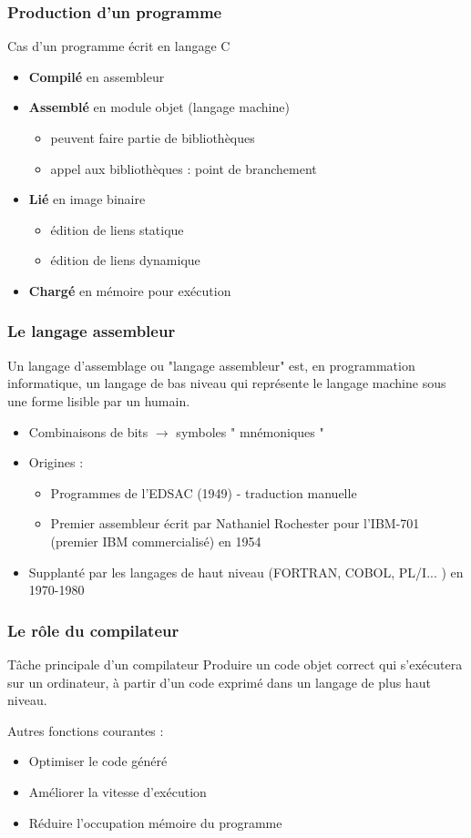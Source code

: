 \begin{frame}
\frametitle{Production d'un programme}
Cas d'un programme écrit en langage C
\begin{itemize}
\item \textbf{Compilé} en assembleur
\item \textbf{Assemblé} en module objet (langage machine)
\begin{itemize}
\item peuvent faire partie de bibliothèques
\item appel aux bibliothèques : point de branchement
\end{itemize}
\item \textbf{Lié} en image binaire
\begin{itemize}
\item édition de liens statique
\item édition de liens dynamique
\end{itemize}
\item \textbf{Chargé} en mémoire pour exécution
\end{itemize}
\end{frame}

\begin{frame}
\frametitle{Le langage assembleur \cite{wp-assembleur}}
\begin{definition}
Un langage d'assemblage ou "langage assembleur" est, en programmation informatique, un langage de bas niveau qui représente le langage machine sous une forme lisible par un humain.
\end{definition}
\begin{itemize}
\item Combinaisons de bits $\rightarrow$ symboles " mnémoniques "
\item Origines : \begin{itemize}
\item Programmes de l'EDSAC (1949) - traduction manuelle
\item Premier assembleur écrit par Nathaniel Rochester pour l'IBM-701 (premier IBM commercialisé) en 1954
\end{itemize}
\item Supplanté par les langages de haut niveau (FORTRAN, COBOL, PL/I... ) en 1970-1980
\end{itemize}

\end{frame}

\begin{frame}
\frametitle{Le rôle du compilateur}
\begin{block}{Tâche principale d'un compilateur}
Produire un code objet correct qui s'exécutera sur un ordinateur, à partir d'un code exprimé dans un langage de plus haut niveau.
\end{block}
Autres fonctions courantes :
\begin{itemize}
\item Optimiser le code généré
\item Améliorer la vitesse d'exécution
\item Réduire l'occupation mémoire du programme
\end{itemize}
\end{frame}

